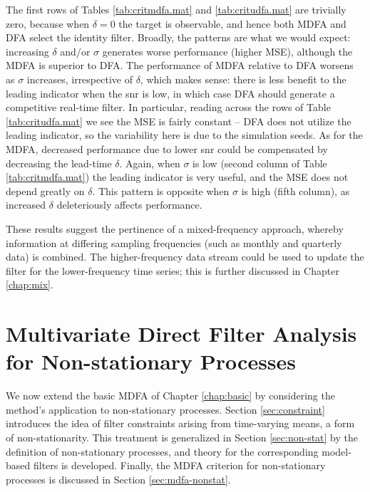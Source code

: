 \documentclass[a4paper]{book}
\begin{document}
 The first rows of Tables \ref{tab:critmdfa.mat} and \ref{tab:critudfa.mat}
 are trivially zero, because when $\delta = 0$ the target is observable,
 and hence both MDFA and DFA select the identity filter.  
 Broadly, the patterns are what we would expect: increasing $\delta$ and/or
 $\sigma$ generates worse performance (higher MSE), although the MDFA is
 superior to DFA.  The performance of MDFA relative to DFA worsens as 
 $\sigma$ increases, irrespective of $\delta$, which makes sense: there
 is less benefit to the leading indicator when the snr is low, in which
 case DFA should generate a competitive real-time filter.
  In particular, reading across the rows of Table \ref{tab:critudfa.mat}
 we see the MSE is fairly constant -- DFA does not utilize the leading indicator,
 so the variability here is due to the simulation seeds.
  As for the MDFA, decreased performance due to lower snr could be 
 compensated by decreasing the lead-time $\delta$.  
  Again, when $\sigma$ is low (second column of Table \ref{tab:critmdfa.mat})
  the leading indicator is very useful, and the MSE does not depend 
 greatly on $\delta$.  This pattern is opposite when $\sigma$ is high 
 (fifth column), as increased $\delta$ deleteriously affects performance.

   
These results suggest the pertinence of a mixed-frequency approach,
 whereby information at differing sampling frequencies (such as monthly
 and quarterly data) is combined.  The higher-frequency data stream
 could be used to update the filter for the lower-frequency time series;
 this is further discussed in Chapter \ref{chap:mix}. 
 






\chapter{Multivariate Direct Filter Analysis for Non-stationary Processes}
\label{chap:int}

 We now extend the basic MDFA of Chapter \ref{chap:basic}  by considering
 the method's application to  non-stationary processes.  
 Section \ref{sec:constraint} introduces the idea of filter constraints
arising from time-varying means, a form of non-stationarity.
 This treatment is generalized in Section \ref{sec:non-stat}
  by the definition of non-stationary processes, and theory for the corresponding
   model-based filters is developed.  Finally, the MDFA criterion for
    non-stationary processes is discussed in Section \ref{sec:mdfa-nonstat}.
 
\end{document}
